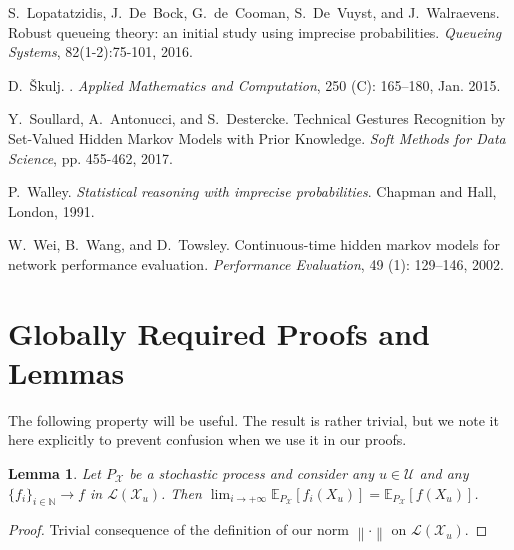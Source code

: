 \documentclass[3p]{elsarticle}
\newtheorem{lemma}[theorem]{Lemma}
\newcommand{\nats}{\mathbb{N}}
\newcommand{\states}{\mathcal{X}}
\newcommand{\gambles}{\mathcal{L}}
\newcommand{\norm}[1]{\left\lVert #1 \right\rVert}
\begin{document}
\begin{thebibliography}{8}
S.~Lopatatzidis, J.~De~Bock, G.~de~Cooman, S.~De~Vuyst, and J.~Walraevens.
\newblock Robust queueing theory: an initial study using imprecise probabilities.
\newblock \emph{Queueing Systems}, 82(1-2):75-101, 2016.


D.~{\v{S}}kulj.
.
\newblock \emph{Applied Mathematics and Computation}, 250
  (C): 165--180, Jan. 2015.

Y.~Soullard, A.~Antonucci, and S.~Destercke.
\newblock Technical Gestures Recognition by Set-Valued Hidden Markov Models with Prior Knowledge.
\newblock \emph{Soft Methods for Data Science}, pp. 455-462, 2017.

P.~Walley.
\newblock \emph{{Statistical reasoning with imprecise probabilities}}.
\newblock Chapman and Hall, London, 1991.

W.~Wei, B.~Wang, and D.~Towsley.
\newblock Continuous-time hidden markov models for network performance
  evaluation.
\newblock \emph{Performance Evaluation}, 49 (1): 129--146,
  2002.

\end{thebibliography}



\newpage




\section{Globally Required Proofs and Lemmas}

The following property will be useful. The result is rather trivial, but we note it here explicitly to prevent confusion when we use it in our proofs.
\begin{lemma}\label{lemma:limit_exp_is_exp_limit}
Let $P_\states$ be a stochastic process and consider any $u\in\mathcal{U}$ and any $\{f_i\}_{i\in\nats}\to f$ in $\gambles(\states_u)$. Then $\lim_{i\to+\infty}\mathbb{E}_{P_\states}[f_i(X_u)]=\mathbb{E}_{P_\states}[f(X_u)]$.
\end{lemma}
\begin{proof}
Trivial consequence of the definition of our norm $\norm{\cdot}$ on $\gambles(\states_u)$.
\end{proof}
\end{document}
